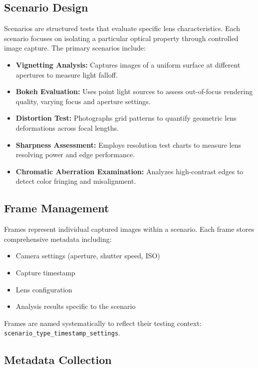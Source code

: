 \subsection{Scenario Design}
Scenarios are structured tests that evaluate specific lens characteristics. Each scenario focuses on isolating a particular optical property through controlled image capture. The primary scenarios include:

\begin{itemize}
    \item \textbf{Vignetting Analysis:} Captures images of a uniform surface at different apertures to measure light falloff.
    \item \textbf{Bokeh Evaluation:} Uses point light sources to assess out-of-focus rendering quality, varying focus and aperture settings.
    \item \textbf{Distortion Test:} Photographs grid patterns to quantify geometric lens deformations across focal lengths.
    \item \textbf{Sharpness Assessment:} Employs resolution test charts to measure lens resolving power and edge performance.
    \item \textbf{Chromatic Aberration Examination:} Analyzes high-contrast edges to detect color fringing and misalignment.
\end{itemize}

\subsection{Frame Management}
Frames represent individual captured images within a scenario. Each frame stores comprehensive metadata including:

\begin{itemize}
    \item Camera settings (aperture, shutter speed, ISO)
    \item Capture timestamp
    \item Lens configuration
    \item Analysis results specific to the scenario
\end{itemize}

Frames are named systematically to reflect their testing context: \texttt{scenario\_type\_timestamp\_settings}.

\subsection{Metadata Collection}

